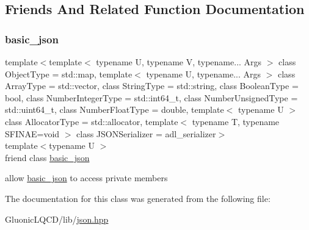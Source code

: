 \subsection{Friends And Related Function Documentation}
\mbox{\label{classnlohmann_1_1basic__json_1_1iter__impl_ada3100cdb8700566051828f1355fa745}} 
\subsubsection{\texorpdfstring{basic\_json}{basic\_json}}
{\footnotesize\ttfamily template$<$template$<$ typename U, typename V, typename... Args $>$ class Object\+Type = std\+::map, template$<$ typename U, typename... Args $>$ class Array\+Type = std\+::vector, class String\+Type  = std\+::string, class Boolean\+Type  = bool, class Number\+Integer\+Type  = std\+::int64\+\_\+t, class Number\+Unsigned\+Type  = std\+::uint64\+\_\+t, class Number\+Float\+Type  = double, template$<$ typename U $>$ class Allocator\+Type = std\+::allocator, template$<$ typename T, typename S\+F\+I\+N\+A\+E=void $>$ class J\+S\+O\+N\+Serializer = adl\+\_\+serializer$>$ \\
template$<$typename U $>$ \\
friend class \mbox{\hyperlink{classnlohmann_1_1basic__json}{basic\+\_\+json}}\hspace{0.3cm}{\ttfamily [friend]}}



allow \mbox{\hyperlink{classnlohmann_1_1basic__json}{basic\+\_\+json}} to access private members 



The documentation for this class was generated from the following file\+:\begin{DoxyCompactItemize}
\item 
Gluonic\+L\+Q\+C\+D/lib/\mbox{\hyperlink{json_8hpp}{json.\+hpp}}\end{DoxyCompactItemize}
